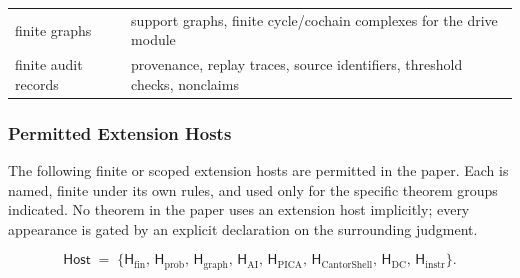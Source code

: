 \documentclass[11pt]{article}
\theoremstyle{definition}
\begin{document}
\begin{longtable}[]{@{}ll@{}}
\begin{minipage}[t]{0.47\columnwidth}
finite graphs\strut
\end{minipage} & \begin{minipage}[t]{0.47\columnwidth}\raggedright
support graphs, finite cycle/cochain complexes for the drive module\strut
\end{minipage}\tabularnewline
\begin{minipage}[t]{0.47\columnwidth}\raggedright
finite audit records\strut
\end{minipage} & \begin{minipage}[t]{0.47\columnwidth}\raggedright
provenance, replay traces, source identifiers, threshold checks, nonclaims\strut
\end{minipage}\tabularnewline
\bottomrule
\end{longtable}

\subsubsection{Permitted Extension Hosts}

The following finite or scoped extension hosts are permitted in the paper. Each is named, finite under its own rules, and used only for the specific theorem groups indicated. No theorem in the paper uses an extension host implicitly; every appearance is gated by an explicit declaration on the surrounding judgment.

\[
\mathsf{Host}\;=\;\bigl\{\mathsf H_{\mathrm{fin}},\,\mathsf H_{\mathrm{prob}},\,\mathsf H_{\mathrm{graph}},\,\mathsf H_{\mathrm{AI}},\,\mathsf H_{\mathrm{PICA}},\,\mathsf H_{\mathrm{CantorShell}},\,\mathsf H_{\mathrm{DC}},\,\mathsf H_{\mathrm{instr}}\bigr\}.
\]
\end{document}
